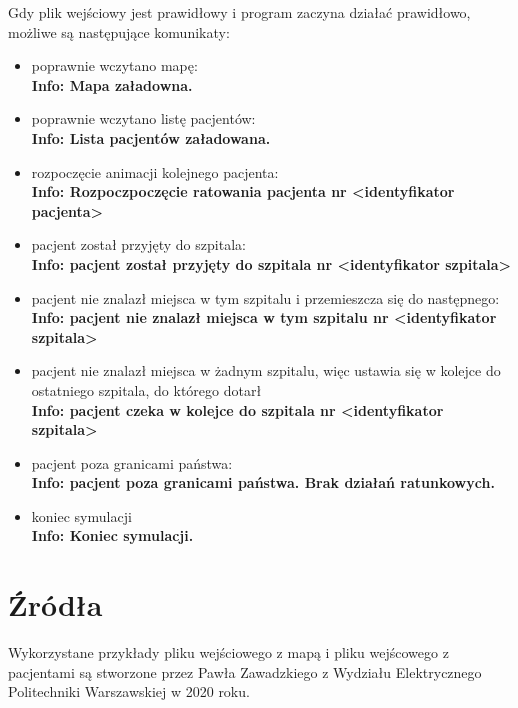 \documentclass[10pt,a4paper]{article}
\begin{document}
Gdy plik wejściowy jest prawidłowy i program zaczyna działać prawidłowo, możliwe są następujące komunikaty:
\begin{itemize}
\item poprawnie wczytano mapę:\\ \textbf{Info: Mapa załadowna.}
\item poprawnie wczytano listę pacjentów:\\ \textbf{Info: Lista pacjentów załadowana.}
\item rozpoczęcie animacji kolejnego pacjenta:\\ \textbf{Info: Rozpoczpoczęcie ratowania pacjenta nr \textless identyfikator pacjenta\textgreater} 
\item pacjent został przyjęty do szpitala:\\ \textbf{Info: pacjent został przyjęty do szpitala nr \textless identyfikator szpitala\textgreater}
\item pacjent nie znalazł miejsca w tym szpitalu i przemieszcza się do następnego:\\ \textbf{Info: pacjent nie znalazł miejsca w tym szpitalu nr \textless identyfikator szpitala\textgreater}
\item pacjent nie znalazł miejsca w żadnym szpitalu, więc ustawia się w kolejce do ostatniego szpitala, do którego dotarł\\ 			\textbf{Info: pacjent czeka w kolejce do szpitala nr \textless identyfikator szpitala\textgreater}
\item pacjent poza granicami państwa: \\ \textbf{Info: pacjent poza granicami państwa. Brak działań ratunkowych.}
\item koniec symulacji \\ \textbf{Info: Koniec symulacji.}
\end{itemize}

\section{Źródła}
Wykorzystane przykłady pliku wejściowego z mapą i pliku wejścowego z pacjentami są stworzone przez Pawła Zawadzkiego z Wydziału Elektrycznego Politechniki Warszawskiej w 2020 roku.
\end{document}
